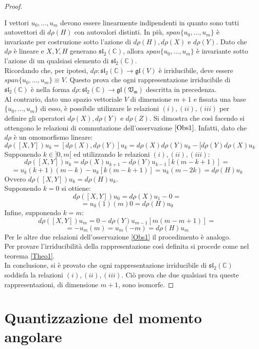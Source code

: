 \documentclass[12pt,a4paper]{report}
\theoremstyle{definition}
\theoremstyle{definition}
\theoremstyle{definition}
\theoremstyle{remark}
\begin{document}
\begin{proof}
\begin{itemize}
	\end{itemize}
I vettori $u_0,...,u_m$ devono essere linearmente indipendenti in quanto sono tutti autovettori di $d\rho(H)$ con autovalori distinti. In più, $span\{u_0,...,u_m\}$ è invariante per costruzione sotto l'azione di $d\rho(H),d\rho(X)$ e $d\rho(Y)$. Dato che $d\rho$ è lineare e $X,Y,H$ generano $\mathfrak{sl_2(\mathbb{C})}$, allora $span\{u_0,...,u_m\}$ è invariante sotto l'azione di un qualsiasi elemento di $\mathfrak{sl_2(\mathbb{C})}$.\\
Ricordando che, per ipotesi, $d\rho:\mathfrak{sl_2(\mathbb{C})}\rightarrow \mathfrak{gl}(V)$ è irriducibile, deve essere $span\{u_0,...,u_m\}\equiv V$. Questo prova che ogni rappresentazione irriducibile di $\mathfrak{sl_2(\mathbb{C})}$ è nella forma $d\rho:\mathfrak{sl_2(\mathbb{C})}\rightarrow \mathfrak{gl(V_m)}$ descritta in precedenza.\\
Al contrario, dato uno spazio vettoriale $V$ di dimensione $m+1$ e fissata una base $\{u_0,...,u_m\}$ di esso, è possibile utilizzare le relazioni $(i),(ii),(iii)$ per definire gli operatori $d\rho(X),d\rho(Y)$ e $d\rho(Z)$. Si dimostra che così facendo si ottengono le relazioni di commutazione dell'osservazione $\ref{Obs1}$. Infatti, dato che $d\rho$ è un omomorfismo lineare:
$$d\rho([X,Y])u_k=[d\rho(X),d\rho(Y)]u_k=d\rho(X)d\rho(Y)u_k-[d\rho(Y)d\rho(X)u_k$$
Supponendo $k\in ]0,m[$ ed utilizzando le relazioni $(i),(ii),(iii)$:
$$d\rho([X,Y])u_k=d\rho(X)u_{k+1}-d\rho(Y)u_{k-1}[k(m-k+1)]=$$
$$=u_k(k+1)(m-k)-u_k[k(m-k+1)]=u_k(m-2k)=d\rho(H)u_k$$
Ovvero $d\rho([X,Y])u_k=d\rho(H)u_k$.\\
Supponendo $k=0$ si ottiene: $$d\rho([X,Y])u_0=d\rho(X)u_{1}-0=$$
$$=u_0(1)(m)0=d\rho(H)u_0$$
Infine, supponendo $k=m$:
$$d\rho([X,Y])u_m=0-d\rho(Y)u_{m-1}[m(m-m+1)]=$$
$$=-u_m(m)=u_m(-m)=d\rho(H)u_m$$
Per le altre due relazioni dell'osservazione \ref{Obs1} il procedimento è analogo.\\
Per provare l'irriducibilità della rappresentazione così definita si procede come nel teorema \ref{Theo1}.\\
In conclusione, si è provato che ogni rappresentazione irriducibile di $\mathfrak{sl_2(\mathbb{C})}$ soddisfa la relazioni $(i),(ii),(iii)$. Ciò prova che due qualsiasi tra queste rappresentazioni, di dimensione $m+1$, sono isomorfe.
\end{proof}
\chapter{Quantizzazione del momento angolare}
\end{document}
